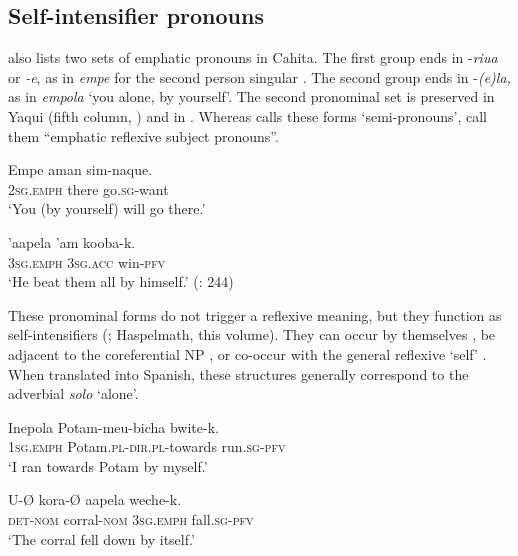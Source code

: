 \documentclass[output=paper]{langscibook}
\begin{document}
\subsection{Self-intensifier pronouns}\label{sec:guerrero:2.4}



\citet{Buelna1890} also lists two sets of emphatic pronouns in Cahita. The first group ends in -\textit{riua} or \textit{{}-e}, as in \textit{empe} for the second person singular . The second group ends in -\textit{(e)la,} as in \textit{empola} ‘you alone, by yourself’. The second pronominal set is preserved in Yaqui (fifth column, ) and in . Whereas \citet[53-54]{Buelna1890} calls these forms ‘semi-pronouns’, \citet[243-244]{DedrickCasad1999} call them “emphatic reflexive subject pronouns”.



\ea%
    \label{ex:guerrero:12}

\ea
\label{ex:guerrero:12a}
\gll Empe   aman   sim-naque.\\
  \textsc{2sg.emph}  there   go.\textsc{sg}{}-want\\
\glt ‘You (by yourself) will go there.’  \citep[53]{Buelna1890}

\ex
\label{ex:guerrero:12b}
\gll ’aapela  ’am   kooba-k.\\
    \textsc{3sg.emph}     \textsc{3sg.acc}   win-\textsc{pfv}\\
\glt ‘He beat them all by himself.’ (\citealt{DedrickCasad1999}: 244)
\z
\z



These pronominal forms do not trigger a reflexive meaning, but they function as self-intensifiers (\citealt{Koenig2001}; Haspelmath, this volume). They can occur by themselves , be adjacent to the coreferential NP , or co-occur with the general reflexive ‘self’ . When translated into Spanish, these structures generally correspond to the adverbial \textit{solo} ‘alone’.



\ea%
\label{ex:guerrero:13}

\ea
\label{ex:guerrero:13a}
\gll Inepola Potam-meu-bicha bwite-k.\\
  \textsc{1sg.emph}  Potam.\textsc{pl-dir.pl-}towards  run.\textsc{sg-pfv}\\
\glt ‘I ran towards Potam by myself.’

\ex
\label{ex:guerrero:13b}
\gll U-Ø   kora-Ø   aapela   weche-k.\\
  \textsc{det-nom}  corral-\textsc{nom}  \textsc{3sg.emph}  fall.\textsc{sg-pfv}\\
\glt ‘The corral fell down by itself.’
\end{document}
